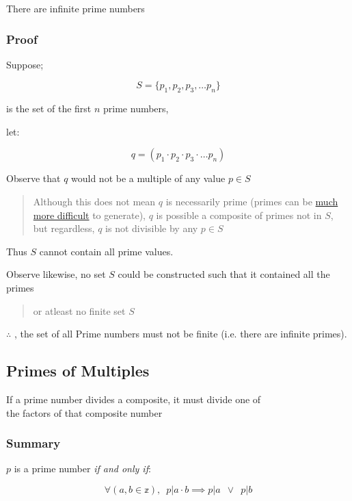 \documentclass[
]{article}
\begin{document}
There are infinite prime numbers

\hypertarget{header-n186}{%
\subsubsection{Proof}\label{header-n186}}

Suppose;

\[S = \{p_1, p_2, p_3, \dots p_n\}\]

is the set of the first \(n\) prime numbers,

let:

\[q = (p_1 \cdot p_2 \cdot p_3 \cdot \dots p_n)\]

Observe that \(q\) would not be a multiple of any value \(p \in S\)

\begin{quote}
Although this does not mean \(q\) is necessarily prime (primes can be
\href{https://www.youtube.com/watch?v=tlpYjrbujG0}{much more difficult}
to generate), \(q\) is possible a composite of primes not in \(S\), but
regardless, \(q\) is not divisible by any \(p \in S\)
\end{quote}

Thus \(S\) cannot contain all prime values.

Observe likewise, no set \(S\) could be constructed such that it
contained all the primes

\begin{quote}
or atleast no finite set \(S\)
\end{quote}

\(\therefore\) , the set of all Prime numbers must not be finite (i.e.
there are infinite primes).

\hypertarget{header-n202}{%
\subsection{Primes of Multiples}\label{header-n202}}

If a prime number divides a composite, it must divide one of\\
the factors of that composite number

\hypertarget{header-n204}{%
\subsubsection{Summary}\label{header-n204}}

\(p\) is a prime number \emph{if and only if}:

\[\forall (a,b \in \mathbb{z}), \enspace p|a\cdot b \implies p|a \enspace \vee \enspace p|b\]
\end{document}
